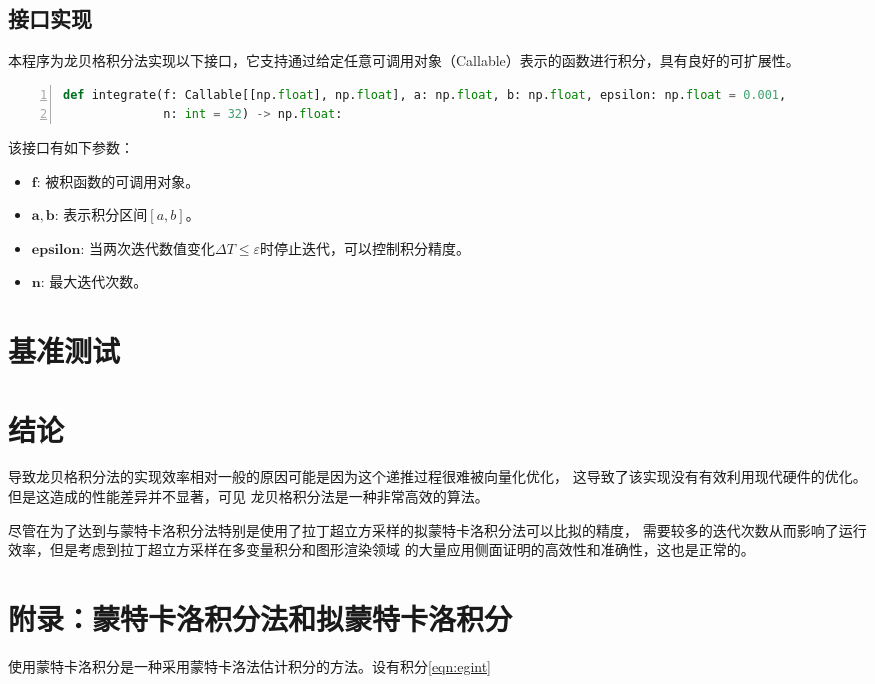 \documentclass[a4paper,twoside]{article}
\begin{document}
\begin{spacing}{1.2}
\subsection{接口实现}

本程序为龙贝格积分法实现以下接口，它支持通过给定任意可调用对象（Callable）表示的函数进行积分，具有良好的可扩展性。
\begin{lstlisting}[language=Python,numbers=left,style=PythonStyle,label={code:interface}]
def integrate(f: Callable[[np.float], np.float], a: np.float, b: np.float, epsilon: np.float = 0.001,
              n: int = 32) -> np.float:
\end{lstlisting}

该接口有如下参数：
\begin{itemize}
	\item $\mathbf{f}$: 被积函数的可调用对象。
	\item $\mathbf{a}, \mathbf{b}$: 表示积分区间$[a,b]$。
	\item $\mathbf{epsilon}$: 当两次迭代数值变化$\Delta T\le \varepsilon$时停止迭代，可以控制积分精度。
	\item  $\mathbf{n}$: 最大迭代次数。
\end{itemize}


\section{基准测试}

\section{结论}

导致龙贝格积分法的实现效率相对一般的原因可能是因为这个递推过程很难被向量化优化，
这导致了该实现没有有效利用现代硬件的优化。但是这造成的性能差异并不显著，可见
龙贝格积分法是一种非常高效的算法。

尽管在为了达到与蒙特卡洛积分法特别是使用了拉丁超立方采样的拟蒙特卡洛积分法可以比拟的精度，
需要较多的迭代次数从而影响了运行效率，但是考虑到拉丁超立方采样在多变量积分和图形渲染领域
的大量应用侧面证明的高效性和准确性，这也是正常的。


\clearpage

\appendix

\section{附录：蒙特卡洛积分法和拟蒙特卡洛积分}

使用蒙特卡洛积分是一种采用蒙特卡洛法估计积分的方法。设有积分\eqref{eqn:egint}


\end{spacing}
\end{document}
